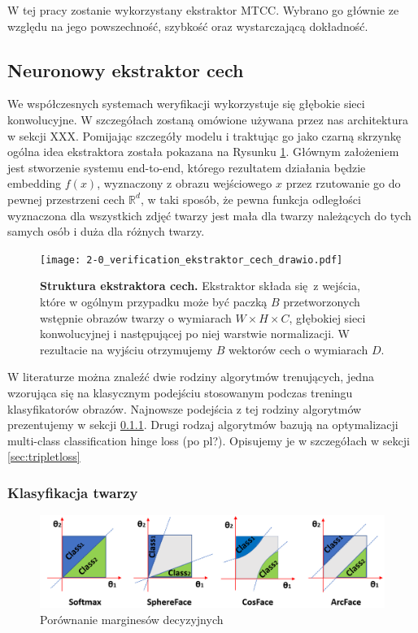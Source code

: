 W tej pracy zostanie wykorzystany ekstraktor MTCC. Wybrano go głównie ze względu na jego powszechność, szybkość oraz wystarczającą dokładność.

\subsection{Neuronowy ekstraktor cech} \label{sec:ekstraktor}

We współczesnych systemach weryfikacji wykorzystuje się głębokie sieci konwolucyjne. W
szczegółach zostaną omówione używana przez nas architektura w sekcji XXX. Pomijając szczegóły
modelu i traktując go jako czarną skrzynkę ogólna idea ekstraktora została pokazana na Rysunku
\ref{fig:ekstraktor_cech}. Głównym założeniem jest stworzenie systemu end-to-end, którego
rezultatem działania będzie embedding \(f(x)\), wyznaczony z obrazu wejściowego \(x\) przez
rzutowanie go do pewnej przestrzeni cech \(\mathbb{R}^d\), w taki sposób, że pewna funkcja
odległości wyznaczona dla wszystkich zdjęć twarzy jest mała dla twarzy należących do tych samych
osób i duża dla różnych twarzy. 

\begin{figure}[h]
    \centering
    \texttt{[image: 2-0\_verification\_ekstraktor\_cech\_drawio.pdf]}
    \caption{\textbf{Struktura ekstraktora cech.} Ekstraktor składa się z wejścia, które w ogólnym przypadku może być paczką \(B\) przetworzonych wstępnie obrazów twarzy o wymiarach \( W \times H \times C\), głębokiej sieci konwolucyjnej i następującej po niej warstwie normalizacji. W rezultacie na wyjściu otrzymujemy \(B\) wektorów cech o wymiarach \(D\).}
    \label{fig:ekstraktor_cech}
\end{figure}


W literaturze można znaleźć dwie rodziny algorytmów trenujących, jedna wzorująca się na
klasycznym podejściu stosowanym podczas treningu klasyfikatorów obrazów. Najnowsze podejścia z
tej rodziny algorytmów prezentujemy w sekcji \ref{sec:klasyfikatory}. Drugi rodzaj algorytmów
bazują na optymalizacji multi-class classification hinge loss (po pl?). Opisujemy je w
szczegółach w sekcji \ref{sec:tripletloss}

\subsubsection{Klasyfikacja twarzy}\label{sec:klasyfikatory}
\begin{figure}[h!]
\centering
\includegraphics[width=1\linewidth]{img/margincompare.png}
\caption{Porównanie marginesów decyzyjnych\cite{}}
\vspace{-4mm}
\label{fig:binarymargin}
\end{figure}
